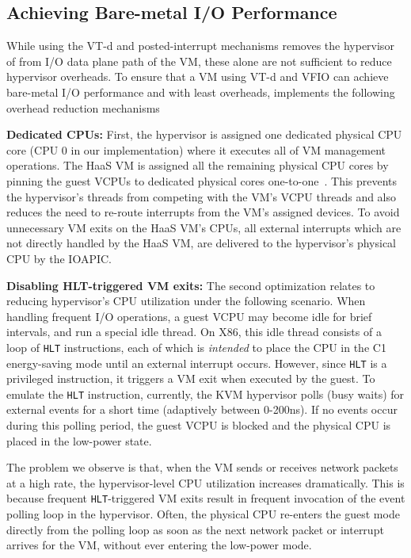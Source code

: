 \subsection{Achieving Bare-metal I/O Performance}
While using the VT-d and posted-interrupt mechanisms removes
the hypervisor of from I/O data plane path of the VM, these alone are
not sufficient to reduce hypervisor overheads.
To ensure that a VM using VT-d and VFIO can achieve bare-metal
I/O performance and with least overheads, \na implements
the following overhead reduction mechanisms

{\bf Dedicated CPUs:}
First, the hypervisor is assigned one dedicated physical CPU core
(CPU 0 in our implementation)
where it executes all of VM management operations.
The HaaS VM is assigned all the remaining physical
CPU cores by pinning the guest VCPUs to
dedicated physical cores one-to-one~\cite{amit:2015}.
This prevents the hypervisor's threads
from competing with the VM's VCPU threads and
also reduces the need to re-route interrupts
from the VM's assigned devices.
To avoid unnecessary VM exits on the HaaS VM's CPUs,
all external interrupts which are not directly handled
by the HaaS VM, are delivered to the hypervisor's physical
CPU by the IOAPIC.

{\bf Disabling  HLT-triggered VM exits:}
The second optimization relates to reducing hypervisor's CPU utilization
under the following scenario.
When handling frequent I/O operations,
a guest VCPU  may become idle for brief intervals, and
run a special idle thread.
On X86, this idle thread consists of a loop of {\tt HLT} instructions,
each of which is {\em intended} to place the CPU in the C1 energy-saving mode
until an external interrupt occurs.
However, since {\tt HLT} is a privileged instruction, it triggers a
VM exit when executed by the guest.
To emulate the {\tt HLT} instruction, currently, the KVM hypervisor
polls (busy waits) for external events for a short time
(adaptively between 0-200ns). If no events occur during this
polling period, the guest VCPU is blocked and the physical CPU
is placed in the low-power state.

The problem we observe is that, when the VM sends or receives network packets
at a high rate, the hypervisor-level CPU utilization increases
dramatically. This is because frequent {\tt HLT}-triggered VM exits
result in frequent invocation of the event polling loop in the hypervisor.
Often, the physical CPU re-enters the guest mode directly
from the polling loop as soon as the next network packet
or interrupt arrives for the VM, without ever entering the low-power mode.

